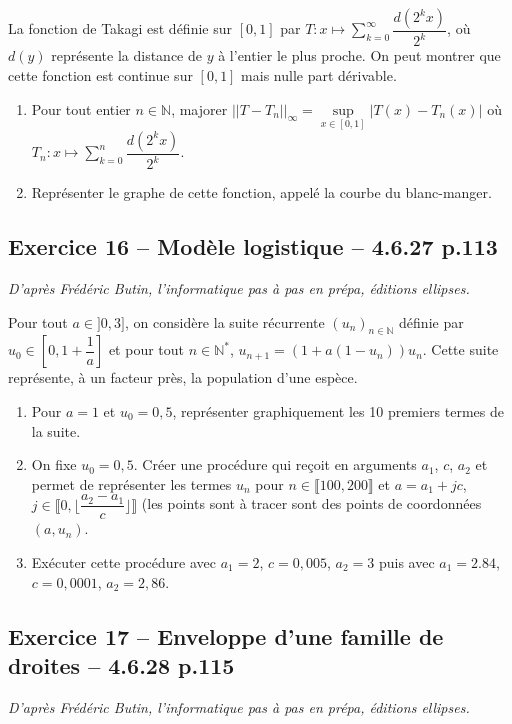 \documentclass[10pt,fleqn]{article} %
\begin{document}
\begin{multicols}{2}
La fonction de Takagi est définie sur $[0,1]$ par $T:x\mapsto \sum\limits_{k=0}^{\infty} \dfrac{d\left( 2^k x \right)}{2^k}$, où $d(y)$ représente la distance de $y$ à l'entier le plus proche. On peut montrer que cette fonction est continue sur $[0,1]$ mais nulle part dérivable.
\begin{enumerate}
\item Pour tout entier $n\in \mathbb{N}$, majorer $||T-T_n||_{\infty}=\sup\limits_{x\in[0,1]} |T(x)-T_n(x)|$ où $T_n:x \mapsto \sum\limits_{k=0}^{n} \dfrac{d\left( 2^k x \right)}{2^k}$.
\item Représenter le graphe de cette fonction, appelé la courbe du blanc-manger.
\end{enumerate}

\subsection*{Exercice 16 -- Modèle logistique -- 4.6.27 p.113}
\begin{flushright}
\textit{D'après Frédéric Butin, l'informatique pas à pas en prépa, éditions ellipses.}
\end{flushright}

Pour tout $a\in]0,3]$,  on considère la suite récurrente $(u_n)_{n\in\mathbb{N}}$ définie par $u_0 \in \left[ 0,1+\dfrac{1}{a}\right]$ et pour tout $n\in\mathbb{N}^*$, $u_{n+1}=\left(1+a\left(1-u_n \right) \right)u_n$. Cette suite représente, à un facteur près, la population d'une espèce.

\begin{enumerate}
\item Pour $a=1$ et $u_0=0,5$, représenter graphiquement les 10 premiers termes de la suite.
\item On fixe $u_0=0,5$. Créer une procédure qui reçoit en arguments $a_1$, $c$, $a_2$ et permet de représenter les termes $u_n$ pour $n\in \llbracket 100,200 \rrbracket$ et $a=a_1+jc$, $j\in\llbracket 0,\lfloor \dfrac{a_2-a_1}{c}\rfloor \rrbracket$ (les points sont à tracer sont des points de coordonnées $(a,u_n)$.
\item Exécuter cette procédure avec $a_1=2$, $c=0,005$, $a_2=3$ puis avec $a_1=2.84$, $c=0,0001$, $a_2=2,86$.
\end{enumerate}


\subsection*{Exercice 17 -- Enveloppe d'une famille de droites -- 4.6.28 p.115}
\begin{flushright}
\textit{D'après Frédéric Butin, l'informatique pas à pas en prépa, éditions ellipses.}
\end{flushright}


\end{multicols}
\end{document}
